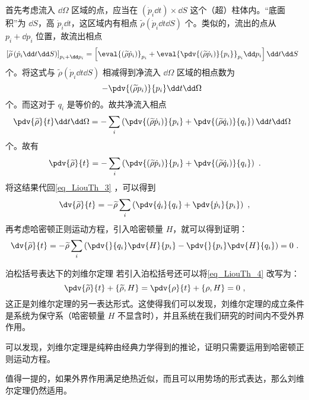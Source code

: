 首先考虑流入 $\dd \Omega$ 区域的点，应当在 $\left(\dot p_i \dd t\right) \times \dd S$ 这个（超）柱体内。“底面积”为 $\dd S$，高 $\dot p_i \dd t$，这区域内有相点 $\widetilde \rho \left(\dot p_i \dd t \dd S \right)$ 个。类似的，流出的点从 $p_i + \dd p_i$ 位置，故流出相点
$$
\left[\widetilde \rho \left(\dot p_i \dd t \dd S\right)\right]_{p_i + \dd p_i} = \left[ \eval{\left(\widetilde\rho \dot p_i\right)}_{p_i} + \eval{\pdv{\left(\widetilde\rho \dot p_i\right)}{p_i}}_{p_i} \dd p_i \right] \dd t \dd S ~~
$$
个。将这式与 $\widetilde \rho \left(\dot p_i \dd t \dd S\right)$ 相减得到净流入 $\dd \Omega$ 区域的相点数为
\begin{equation}
- \pdv{\left(\widetilde \rho p_i\right)}{p_i} \dd t \dd \Omega ~~
\end{equation}
个。而这对于 $q_i$ 是等价的。故共净流入相点
\begin{equation}
\pdv{\widetilde \rho}{t} \dd t \dd \Omega = - \sum_{i} \left(\pdv{\left(\widetilde \rho \dot p_i\right)}{p_i} + \pdv{\left(\widetilde \rho \dot q_i\right)}{q_i}\right) \dd t \dd \Omega ~~
\end{equation}
个。故有
\begin{equation}\label{eq_LiouTh_2}
\pdv{\widetilde \rho}{t} = -\sum_{i} \left(\pdv{\left(\widetilde \rho \dot p_i\right)}{p_i} + \pdv{\left(\widetilde \rho \dot q_i\right)}{q_i}\right) ~.
\end{equation}
将这结果代回\autoref{eq_LiouTh_3} ，可以得到
\begin{equation}
\dv{\widetilde \rho}{t} = -\widetilde \rho \sum_{i} \left(\pdv{\dot q_i}{q_i} + \pdv{\dot p_i}{p_i}\right) ~,
\end{equation}
再考虑哈密顿正则运动方程，引入哈密顿量 $H$，就可以得到证明：
\begin{equation}\label{eq_LiouTh_4}
\dv{\widetilde \rho}{t} = -\widetilde \rho \sum_{i} \left(\pdv{}{q_i} \pdv{H}{p_i} - \pdv{}{p_i} \pdv{H}{q_i}\right) = 0 ~.
\end{equation}

\begin{corollary}{泊松括号表达下的刘维尔定理}
若引入泊松括号还可以将\autoref{eq_LiouTh_4} 改写为：
\begin{equation}
\pdv{\widetilde \rho}{t} + \{\widetilde \rho, H\} = \pdv{\rho}{t} + \{\rho , H\} = 0 ~,
\end{equation}
这正是刘维尔定理的另一表达形式。这使得我们可以发现，刘维尔定理的成立条件是系统为保守系（哈密顿量 $H$ 不显含时），并且系统在我们研究的时间内不受外界作用。

可以发现，刘维尔定理是纯粹由经典力学得到的推论，证明只需要运用到哈密顿正则运动方程。

值得一提的，如果外界作用满足绝热近似，而且可以用势场的形式表达，那么刘维尔定理仍然适用。
\end{corollary}

